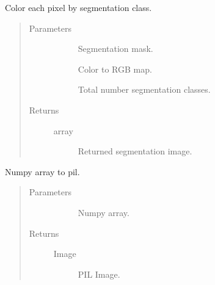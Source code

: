 \documentclass[letterpaper,10pt,english]{sphinxmanual}
\begin{document}
\begin{fulllineitems}
\label{\detokenize{index:pathflowai.visualize.seg2rgb}}
Color each pixel by segmentation class.
\begin{quote}\begin{description}
\item[{Parameters}] \leavevmode\begin{description}
\item[{}] \leavevmode
Segmentation mask.

\item[{}] \leavevmode
Color to RGB map.

\item[{}] \leavevmode
Total number segmentation classes.

\end{description}

\item[{Returns}] \leavevmode\begin{description}
\item[{array}] \leavevmode
Returned segmentation image.

\end{description}

\end{description}\end{quote}

\end{fulllineitems}


\begin{fulllineitems}
\label{\detokenize{index:pathflowai.visualize.to_pil}}
Numpy array to pil.
\begin{quote}\begin{description}
\item[{Parameters}] \leavevmode\begin{description}
\item[{}] \leavevmode
Numpy array.

\end{description}

\item[{Returns}] \leavevmode\begin{description}
\item[{Image}] \leavevmode
PIL Image.

\end{description}

\end{description}\end{quote}

\end{fulllineitems}
\end{document}
